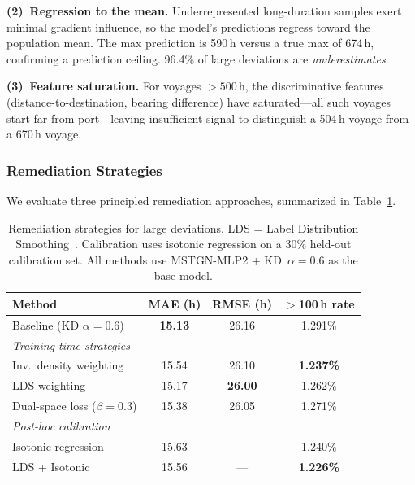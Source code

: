 \documentclass[conference]{IEEEtran}
\begin{document}
\textbf{(2)~Regression to the mean.}
Underrepresented long-duration samples exert minimal gradient influence, so the model's predictions regress toward the population mean.
The max prediction is 590\,h versus a true max of 674\,h, confirming a prediction ceiling.
96.4\% of large deviations are \textit{underestimates}.

\textbf{(3)~Feature saturation.}
For voyages $> 500$\,h, the discriminative features (distance-to-destination, bearing difference) have saturated---all such voyages start far from port---leaving insufficient signal to distinguish a 504\,h voyage from a 670\,h voyage.

\subsubsection{Remediation Strategies}
\label{sec:remediation}

We evaluate three principled remediation approaches, summarized in Table~\ref{tab:remediation}.

\begin{table}[t]
    \centering
    \caption{Remediation strategies for large deviations. LDS = Label Distribution Smoothing~\cite{yang2021lds}. Calibration uses isotonic regression on a 30\% held-out calibration set. All methods use MSTGN-MLP2 + KD~$\alpha{=}0.6$ as the base model.}
    \label{tab:remediation}
    \begin{tabular}{lccc}
        \toprule
        \textbf{Method} & \textbf{MAE (h)} & \textbf{RMSE (h)} & \textbf{$>$100\,h rate} \\
        \midrule
        Baseline (KD $\alpha{=}0.6$) & \textbf{15.13} & 26.16 & 1.291\% \\
        \midrule
        \multicolumn{4}{l}{\textit{Training-time strategies}} \\
        \quad Inv.\ density weighting & 15.54 & 26.10 & \textbf{1.237\%} \\
        \quad LDS weighting          & 15.17 & \textbf{26.00} & 1.262\% \\
        \quad Dual-space loss ($\beta{=}0.3$) & 15.38 & 26.05 & 1.271\% \\
        \midrule
        \multicolumn{4}{l}{\textit{Post-hoc calibration}} \\
        \quad Isotonic regression     & 15.63 & --- & 1.240\% \\
        \quad LDS + Isotonic          & 15.56 & --- & \textbf{1.226\%} \\
        \bottomrule
    \end{tabular}
\end{table}
\end{document}
